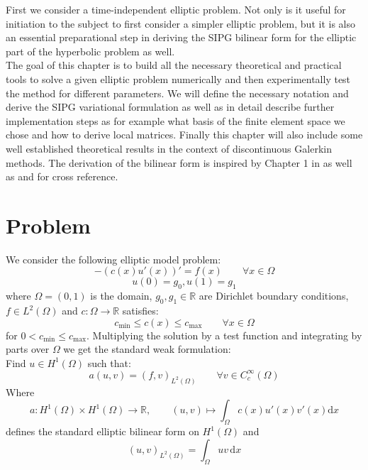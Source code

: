 First we consider a time-independent elliptic problem. Not only is it 
useful for initiation to the subject to first consider a simpler elliptic problem, but it 
is also an essential preparational step in deriving the SIPG bilinear form for the 
elliptic part of the hyperbolic problem as well.
\\
The goal of this chapter is to build all the necessary theoretical and practical 
tools to solve a given elliptic problem 
numerically and then experimentally test the method for different parameters. 
We will define the necessary notation and derive
the SIPG variational formulation as well as in detail describe further implementation steps as 
for example what basis of the finite element space we chose and how to derive local matrices. 
Finally this chapter will also include some well established theoretical results in 
the context of discontinuous Galerkin methods.
The derivation
of the bilinear form is inspired by 
Chapter 1 in \cite{riviere2008} as well as \cite{georgoulis2011Springer} and \cite{grote2006}
for cross reference.

\section{Problem}
We consider the following elliptic model problem:
\begin{equation}
    \label{eq:elliptic_pde}
    -(c(x)u'(x))' = f(x) \qquad \forall x\in \Omega
\end{equation} 
\begin{equation}
    \label{eq:elliptic_pde_bc}
    u(0) = g_0, u(1) = g_1
\end{equation}
where $\Omega = (0,1)$ is the domain, $g_0, g_1 \in \mathbb{R}$ are
Dirichlet boundary conditions, $f \in L^2(\Omega)$ and $c:\Omega \to \mathbb{R}$
satisfies:
\[
    c_{\min} \leq c(x) \leq c_{\max} \qquad \forall x\in \Omega
\]
for $0 < c_{\min} \leq c_{\max}$.
Multiplying the solution by a test function and integrating by parts over $\Omega$ we get the 
standard weak formulation: \\
Find $u \in H^1(\Omega)$ such that:
\begin{equation}
    a(u,v) = (f,v)_{L^2(\Omega)} \qquad \forall v \in C_c^{\infty}(\Omega)
\end{equation}
Where 
\[
    a:H^1(\Omega) \times H^1(\Omega) \to \mathbb{R}, \qquad (u,v) \mapsto \int_{\Omega} c(x)u'(x)v'(x) \text{d}x
\]  
defines the standard elliptic bilinear form on $H^1(\Omega)$ and 
\[
    (u,v)_{L^2(\Omega)} = \int_{\Omega} uv \,\text{d}x
\]

